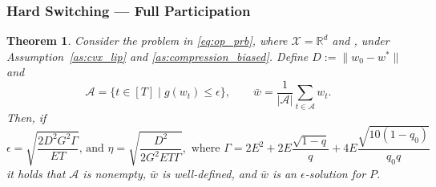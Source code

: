 \documentclass{article} %
\newtheorem{theorem}{Theorem}[]
\def\R{{\mathbb{R}}}
\def\A{{\mathcal A}}
\begin{document}
\subsubsection{Hard Switching --- Full Participation}
\begin{theorem}
    \label{thm:bidirectional_1}
    Consider the problem in \cref{eq:op_prb}, where $\mathcal{X} = \R^d$ and , under Assumption~\ref{as:cvx_lip} and \ref{as:compression_biased}. Define $D:=\|w_0-w^*\|$ and
    \begin{equation*}
    \A = \{t\in [T]\;| \;g(w_{t})\leq \epsilon\}, \qquad \bar{w} = \frac{1}{|\A|} \sum_{t\in \A} w_t.
     \end{equation*}
    Then, if
    \begin{equation*}
    \epsilon = \sqrt{\frac{{2 D^2 G^2 \Gamma}}{{E T}}}\text{, and  } \eta = \sqrt{\frac{D^2}{2G^2 E T \Gamma}}, \text{ where } \Gamma = 2 E^2 + 2E\frac{\sqrt{1-q}}{q} + 4E\frac{\sqrt{10(1-q_0)}}{q_0q} 
     \end{equation*}
    it holds that $\A$ is nonempty, $\bar{w}$ is well-defined, and $\bar{w}$ is an $\epsilon$-solution for $P$.
\end{theorem}
\end{document}
